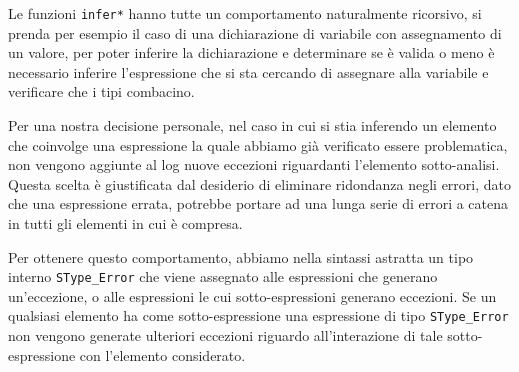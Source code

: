 Le funzioni \texttt{infer*} hanno tutte un comportamento naturalmente ricorsivo, si prenda per esempio il caso di una dichiarazione di variabile con assegnamento di un valore, per poter inferire la dichiarazione e determinare se è valida o meno è necessario inferire l'espressione che si sta cercando di assegnare alla variabile e verificare che i tipi combacino.

Per una nostra decisione personale, nel caso in cui si stia inferendo un elemento che coinvolge una espressione la quale abbiamo già verificato essere problematica, non vengono aggiunte al log nuove eccezioni riguardanti l'elemento sotto-analisi. Questa scelta è giustificata dal desiderio di eliminare ridondanza negli errori, dato che una espressione errata, potrebbe portare ad una lunga serie di errori a catena in tutti gli elementi in cui è compresa.

Per ottenere questo comportamento, abbiamo nella sintassi astratta un tipo interno \texttt{SType\_Error} che viene assegnato alle espressioni che generano un'eccezione, o alle espressioni le cui sotto-espressioni generano eccezioni. Se un qualsiasi elemento ha come sotto-espressione una espressione di tipo \texttt{SType\_Error} non vengono generate ulteriori eccezioni riguardo all'interazione di tale sotto-espressione con l'elemento considerato.

